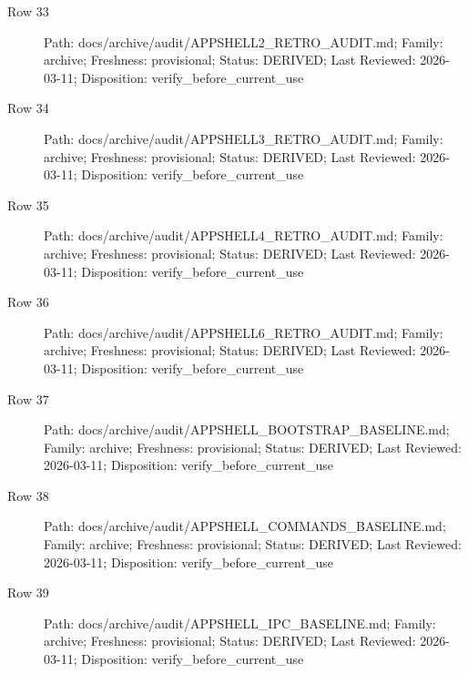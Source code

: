 \documentclass[10.5pt,a4paper,openany]{book}
\begin{document}
\begin{description}
\item[Row 33] Path: docs/\allowbreak{}archive/\allowbreak{}audit/\allowbreak{}APPSHELL2\_\allowbreak{}RETRO\_\allowbreak{}AUDIT.\allowbreak{}md; Family: archive; Freshness: provisional; Status: DERIVED; Last Reviewed: 2026-\allowbreak{}03-\allowbreak{}11; Disposition: verify\_\allowbreak{}before\_\allowbreak{}current\_\allowbreak{}use
\item[Row 34] Path: docs/\allowbreak{}archive/\allowbreak{}audit/\allowbreak{}APPSHELL3\_\allowbreak{}RETRO\_\allowbreak{}AUDIT.\allowbreak{}md; Family: archive; Freshness: provisional; Status: DERIVED; Last Reviewed: 2026-\allowbreak{}03-\allowbreak{}11; Disposition: verify\_\allowbreak{}before\_\allowbreak{}current\_\allowbreak{}use
\item[Row 35] Path: docs/\allowbreak{}archive/\allowbreak{}audit/\allowbreak{}APPSHELL4\_\allowbreak{}RETRO\_\allowbreak{}AUDIT.\allowbreak{}md; Family: archive; Freshness: provisional; Status: DERIVED; Last Reviewed: 2026-\allowbreak{}03-\allowbreak{}11; Disposition: verify\_\allowbreak{}before\_\allowbreak{}current\_\allowbreak{}use
\item[Row 36] Path: docs/\allowbreak{}archive/\allowbreak{}audit/\allowbreak{}APPSHELL6\_\allowbreak{}RETRO\_\allowbreak{}AUDIT.\allowbreak{}md; Family: archive; Freshness: provisional; Status: DERIVED; Last Reviewed: 2026-\allowbreak{}03-\allowbreak{}11; Disposition: verify\_\allowbreak{}before\_\allowbreak{}current\_\allowbreak{}use
\item[Row 37] Path: docs/\allowbreak{}archive/\allowbreak{}audit/\allowbreak{}APPSHELL\_\allowbreak{}BOOTSTRAP\_\allowbreak{}BASELINE.\allowbreak{}md; Family: archive; Freshness: provisional; Status: DERIVED; Last Reviewed: 2026-\allowbreak{}03-\allowbreak{}11; Disposition: verify\_\allowbreak{}before\_\allowbreak{}current\_\allowbreak{}use
\item[Row 38] Path: docs/\allowbreak{}archive/\allowbreak{}audit/\allowbreak{}APPSHELL\_\allowbreak{}COMMANDS\_\allowbreak{}BASELINE.\allowbreak{}md; Family: archive; Freshness: provisional; Status: DERIVED; Last Reviewed: 2026-\allowbreak{}03-\allowbreak{}11; Disposition: verify\_\allowbreak{}before\_\allowbreak{}current\_\allowbreak{}use
\item[Row 39] Path: docs/\allowbreak{}archive/\allowbreak{}audit/\allowbreak{}APPSHELL\_\allowbreak{}IPC\_\allowbreak{}BASELINE.\allowbreak{}md; Family: archive; Freshness: provisional; Status: DERIVED; Last Reviewed: 2026-\allowbreak{}03-\allowbreak{}11; Disposition: verify\_\allowbreak{}before\_\allowbreak{}current\_\allowbreak{}use

\end{description}
\end{document}
